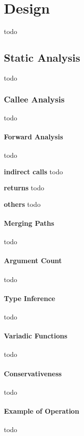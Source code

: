 \chapter{Design}
\label{chapter:Design}
todo

\section{Static Analysis}
\label{Static Analysis}
todo

\subsection{Callee Analysis}
\label{Callee Analysis}
todo

\subsubsection{Forward Analysis}
\label{Forward Analysis}
todo

\textbf{indirect calls}
todo

\textbf{returns}
todo

\textbf{others}
todo

\subsubsection{Merging Paths}
\label{Merging Paths}
todo

\subsubsection{Argument Count}
\label{Argument Count}
todo

\subsubsection{Type Inference}
\label{Type Inference}
todo

\subsubsection{Variadic Functions}
\label{Variadic Functions}
todo

\subsubsection{Conservativeness}
\label{Conservativeness}
todo

\subsubsection{Example of Operation}
\label{Example of Operation}
todo



